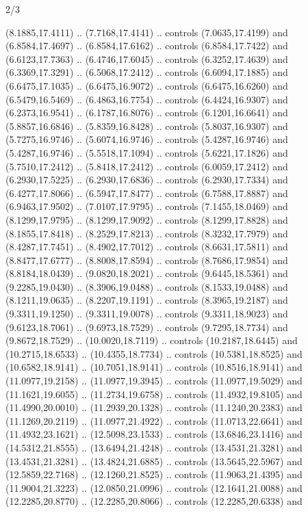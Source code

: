 \begin{flagdescription}{2/3}
\begin{scope}[yshift=\flagwidth,scale=\flagwidth/1241.93737]
\begin{scope}[y=-1mm, x=1mm,draw=gold,fill=blue,line join=miter,miter limit=4,line width=1.8\lw]
{  (8.1885,17.4111) .. (7.7168,17.4141) .. controls (7.0635,17.4199) and
  (6.8584,17.4697) .. (6.8584,17.6162) .. controls (6.8584,17.7422) and
  (6.6123,17.7363) .. (6.4746,17.6045) .. controls (6.3252,17.4639) and
  (6.3369,17.3291) .. (6.5068,17.2412) .. controls (6.6094,17.1885) and
  (6.6475,17.1035) .. (6.6475,16.9072) .. controls (6.6475,16.6260) and
  (6.5479,16.5469) .. (6.4863,16.7754) .. controls (6.4424,16.9307) and
  (6.2373,16.9541) .. (6.1787,16.8076) .. controls (6.1201,16.6641) and
  (5.8857,16.6846) .. (5.8359,16.8428) .. controls (5.8037,16.9307) and
  (5.7275,16.9746) .. (5.6074,16.9746) .. controls (5.4287,16.9746) and
  (5.4287,16.9746) .. (5.5518,17.1094) .. controls (5.6221,17.1826) and
  (5.7510,17.2412) .. (5.8418,17.2412) .. controls (6.0059,17.2412) and
  (6.2930,17.5225) .. (6.2930,17.6836) .. controls (6.2930,17.7334) and
  (6.4277,17.8066) .. (6.5947,17.8477) .. controls (6.7588,17.8887) and
  (6.9463,17.9502) .. (7.0107,17.9795) .. controls (7.1455,18.0469) and
  (8.1299,17.9795) .. (8.1299,17.9092) .. controls (8.1299,17.8828) and
  (8.1855,17.8418) .. (8.2529,17.8213) .. controls (8.3232,17.7979) and
  (8.4287,17.7451) .. (8.4902,17.7012) .. controls (8.6631,17.5811) and
  (8.8477,17.6777) .. (8.8008,17.8594) .. controls (8.7686,17.9854) and
  (8.8184,18.0439) .. (9.0820,18.2021) .. controls (9.6445,18.5361) and
  (9.2285,19.0430) .. (8.3906,19.0488) .. controls (8.1533,19.0488) and
  (8.1211,19.0635) .. (8.2207,19.1191) .. controls (8.3965,19.2187) and
  (9.3311,19.1250) .. (9.3311,19.0078) .. controls (9.3311,18.9023) and
  (9.6123,18.7061) .. (9.6973,18.7529) .. controls (9.7295,18.7734) and
  (9.8672,18.7529) .. (10.0020,18.7119) .. controls (10.2187,18.6445) and
  (10.2715,18.6533) .. (10.4355,18.7734) .. controls (10.5381,18.8525) and
  (10.6582,18.9141) .. (10.7051,18.9141) .. controls (10.8516,18.9141) and
  (11.0977,19.2158) .. (11.0977,19.3945) .. controls (11.0977,19.5029) and
  (11.1621,19.6055) .. (11.2734,19.6758) .. controls (11.4932,19.8105) and
  (11.4990,20.0010) .. (11.2939,20.1328) .. controls (11.1240,20.2383) and
  (11.1269,20.2119) .. (11.0977,21.4922) .. controls (11.0713,22.6641) and
  (11.4932,23.1621) .. (12.5098,23.1533) .. controls (13.6846,23.1416) and
  (14.5312,21.8555) .. (13.6494,21.4248) .. controls (13.4531,21.3281) and
  (13.4531,21.3281) .. (13.4824,21.6885) .. controls (13.5645,22.5967) and
  (12.5859,22.7168) .. (12.1260,21.8525) .. controls (11.9063,21.4395) and
  (11.9004,21.3223) .. (12.0850,21.0996) .. controls (12.1641,21.0088) and
  (12.2285,20.8770) .. (12.2285,20.8066) .. controls (12.2285,20.6338) and
}
\end{scope}
\end{scope}
\end{flagdescription}
